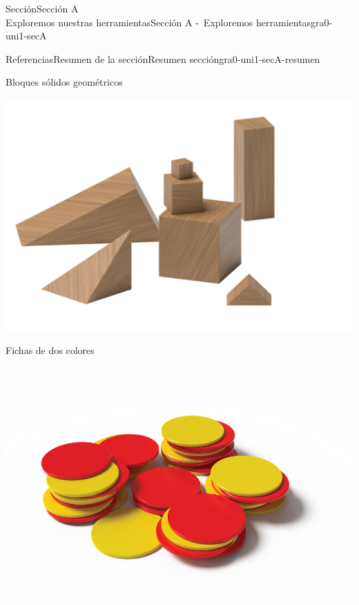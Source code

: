 \begin{sectionptx}{Sección}{{\Large Sección A\\}Exploremos nuestras herramientas}{}{Sección A -~Exploremos herramientas}{}{}{gra0-uni1-secA}
\begin{references-subsection}{Referencias}{Resumen de la sección}{}{Resumen sección}{}{}{gra0-uni1-secA-resumen}
\begin{sidebyside}{2}{0.05}{0.05}{0.1}
\begin{sbspanel}{0.4}
\end{sbspanel}%
\end{sidebyside}%
\begin{sidebyside}{2}{0.05}{0.05}{0.1}%
\begin{sbspanel}{0.4}%
Bloques sólidos geométricos%
\par
\includegraphics[max width=\linewidth, center]{external/png-source/K.1.A Beta Student Workbook.Geoblocks.png}
\end{sbspanel}%
\begin{sbspanel}{0.4}%
Fichas de dos colores%
\par
\includegraphics[max width=\linewidth, center]{external/png-source/K.1.A Beta Student Workbook.RedYellowChips_withShadow.png}
\end{sbspanel}%
\end{sidebyside}%
\begin{sidebyside}{2}{0.05}{0.05}{0.1}%

\end{sidebyside}
\end{references-subsection}
\end{sectionptx}
